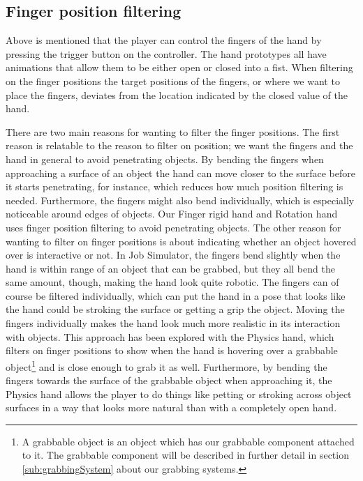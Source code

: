 \subsection{Finger position filtering}
\label{subsec:categoryFingerFiltering}
Above is mentioned that the player can control the fingers of the hand by pressing the trigger button on the controller. The hand prototypes all have animations that allow them to be either open or closed into a fist. When filtering on the finger positions the target positions of the fingers, or where we want to place the fingers, deviates from the location indicated by the closed value of the hand.

There are two main reasons for wanting to filter the finger positions. The first reason is relatable to the reason to filter on position; we want the fingers and the hand in general to avoid penetrating objects. By bending the fingers when approaching a surface of an object the hand can move closer to the surface before it starts penetrating, for instance, which reduces how much position filtering is needed. Furthermore, the fingers might also bend individually, which is especially noticeable around edges of objects. Our Finger rigid hand and Rotation hand uses finger position filtering to avoid penetrating objects. The other reason for wanting to filter on finger positions is about indicating whether an object hovered over is interactive or not. In Job Simulator, the fingers bend slightly when the hand is within range of an object that can be grabbed, but they all bend the same amount, though, making the hand look quite robotic. The fingers can of course be filtered individually, which can put the hand in a pose that looks like the hand could be stroking the surface or getting a grip the object. Moving the fingers individually makes the hand look much more realistic in its interaction with objects. This approach has been explored with the Physics hand, which filters on finger positions to show when the hand is hovering over a grabbable object\footnote{A grabbable object is an object which has our grabbable component attached to it. The grabbable component will be described in further detail in section \ref{sub:grabbingSystem} about our grabbing systems.} and is close enough to grab it as well. Furthermore, by bending the fingers towards the surface of the grabbable object when approaching it, the Physics hand allows the player to do things like petting or stroking across object surfaces in a way that looks more natural than with a completely open hand.


